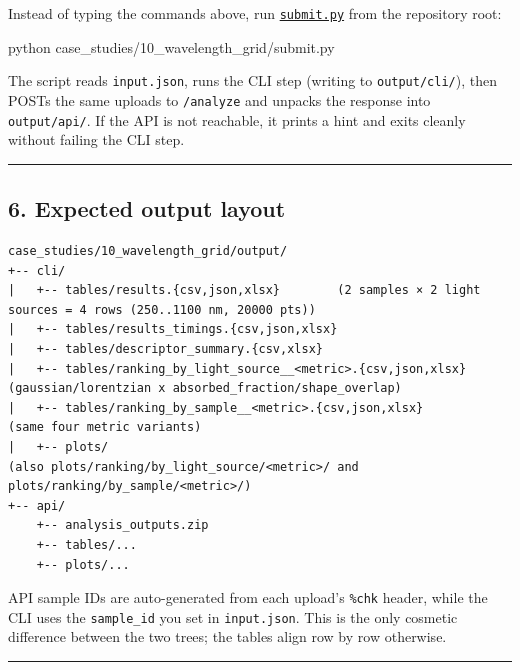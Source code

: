 \documentclass[
  11pt,
]{article}
\newenvironment{Shaded}{}{}
\newcommand{\ExtensionTok}[1]{#1}
\newcommand{\NormalTok}[1]{#1}
\begin{document}
Instead of typing the commands above, run
\href{https://github.com/pinarsyt/overlap-calculator/blob/main/case_studies/10_wavelength_grid/submit.py}{\texttt{submit.py}}
from the repository root:

\begin{Shaded}
\begin{Highlighting}[]
\ExtensionTok{python}\NormalTok{ case\_studies/10\_wavelength\_grid/submit.py}
\end{Highlighting}
\end{Shaded}

The script reads \texttt{input.json}, runs the CLI step (writing to
\texttt{output/cli/}), then POSTs the same uploads to \texttt{/analyze}
and unpacks the response into \texttt{output/api/}. If the API is not
reachable, it prints a hint and exits cleanly without failing the CLI
step.

\begin{center}\rule{0.5\linewidth}{0.5pt}\end{center}

\hypertarget{6-expected-output-layout}{
\subsection{6. Expected output layout}\label{6-expected-output-layout}}

\begin{verbatim}
case_studies/10_wavelength_grid/output/
+-- cli/
|   +-- tables/results.{csv,json,xlsx}        (2 samples × 2 light sources = 4 rows (250..1100 nm, 20000 pts))
|   +-- tables/results_timings.{csv,json,xlsx}
|   +-- tables/descriptor_summary.{csv,xlsx}
|   +-- tables/ranking_by_light_source__<metric>.{csv,json,xlsx}   (gaussian/lorentzian x absorbed_fraction/shape_overlap)
|   +-- tables/ranking_by_sample__<metric>.{csv,json,xlsx}          (same four metric variants)
|   +-- plots/                                                      (also plots/ranking/by_light_source/<metric>/ and plots/ranking/by_sample/<metric>/)
+-- api/
    +-- analysis_outputs.zip
    +-- tables/...
    +-- plots/...
\end{verbatim}

API sample IDs are auto-generated from each upload's \texttt{\%chk}
header, while the CLI uses the \texttt{sample\_id} you set in
\texttt{input.json}. This is the only cosmetic difference between the
two trees; the tables align row by row otherwise.

\begin{center}\rule{0.5\linewidth}{0.5pt}\end{center}
\end{document}
